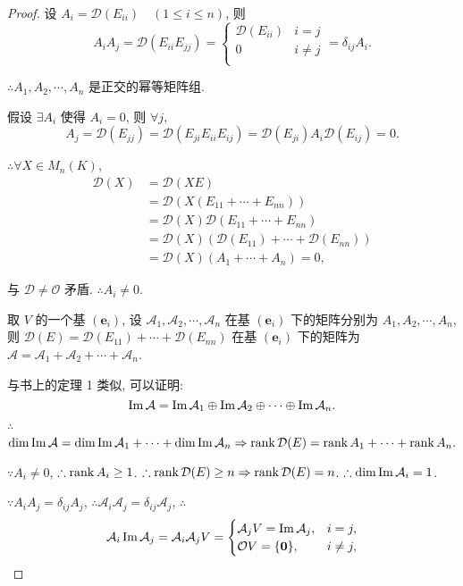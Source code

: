 \documentclass[color=black,device=normal,lang=cn,mode=geye]{elegantnote}
\begin{document}
\begin{proof}
    设 $A_i=\mathcal{D}(E_{ii})\quad(1\leq i\leq n)$, 则
    \[A_iA_j=\mathcal{D}(E_{ii}E_{jj})=\begin{cases}
        \mathcal{D}(E_{ii}) & i=j \\
        0 & i\neq j \\
    \end{cases}=\delta_{ij}A_i.\]

    $\therefore A_1,A_2,\cdots,A_n$ 是正交的幂等矩阵组.

    假设 $\exists A_i$ 使得 $A_i=0$, 则 $\forall j$,
    \[A_j=\mathcal{D}(E_{jj})=\mathcal{D}(E_{ji}E_{ii}E_{ij})=\mathcal{D}(E_{ji})A_i\mathcal{D}(E_{ij})=0.\]

    $\therefore\forall X\in M_n(K)$,
    \begin{align*}
        \mathcal{D}(X) & =\mathcal{D}(XE) \\
        & =\mathcal{D}(X(E_{11}+\cdots+E_{nn})) \\
        & =\mathcal{D}(X)\mathcal{D}(E_{11}+\cdots+E_{nn}) \\
        & =\mathcal{D}(X)(\mathcal{D}(E_{11})+\cdots+\mathcal{D}(E_{nn})) \\
        & =\mathcal{D}(X)(A_1+\cdots+A_n)=0,
    \end{align*}

    与 $\mathcal{D}\neq\mathcal{O}$ 矛盾. $\therefore A_i\neq0$.

    取 $V$ 的一个基 $(\boldsymbol{e}_i)$, 设 $\mathcal{A}_1,\mathcal{A}_2,\cdots,\mathcal{A}_n$ 在基 $(\boldsymbol{e}_i)$ 下的矩阵分别为 $A_1,A_2,\cdots,A_n$, 则 $\mathcal{D}(E)=\mathcal{D}(E_{11})+\cdots+\mathcal{D}(E_{nn})$ 在基 $(\boldsymbol{e}_i)$ 下的矩阵为 $\mathcal{A}=\mathcal{A}_1+\mathcal{A}_2+\cdots+\mathcal{A}_n$.

    与书上的定理 1 类似, 可以证明:
    \begin{equation}\label{eq6.5}
        \operatorname{Im}\mathcal{A}=\operatorname{Im}\mathcal{A}_1\oplus\operatorname{Im}\mathcal{A}_2\oplus\cdots\oplus\operatorname{Im}\mathcal{A}_n.
    \end{equation}

    $\therefore$
    \[\dim\operatorname{Im}\mathcal{A}=\dim\operatorname{Im}\mathcal{A}_1+\cdots+\dim\operatorname{Im}\mathcal{A}_n\Rightarrow\operatorname{rank}\mathcal{D}(E)=\operatorname{rank} A_1+\cdots+\operatorname{rank} A_n.\]

    $\because A_i\neq0$, $\therefore\operatorname{rank} A_i\geq1$. $\therefore\operatorname{rank}\mathcal{D}(E)\geq n\Rightarrow\operatorname{rank}\mathcal{D}(E)=n$. $\therefore\dim\operatorname{Im}\mathcal{A}_i=1$.

    $\because A_iA_j=\delta_{ij}A_j$, $\therefore\mathcal{A}_i\mathcal{A}_j=\delta_{ij}\mathcal{A}_j$, $\therefore$
    \[\mathcal{A}_i\operatorname{Im}\mathcal{A}_j=\mathcal{A}_i\mathcal{A}_jV=\begin{cases}
        \mathcal{A}_jV=\operatorname{Im}\mathcal{A}_j, & i=j, \\
        \mathcal{O}V=\{\boldsymbol{0}\}, & i\neq j, \\
    \end{cases}\]


\end{proof}
\end{document}

